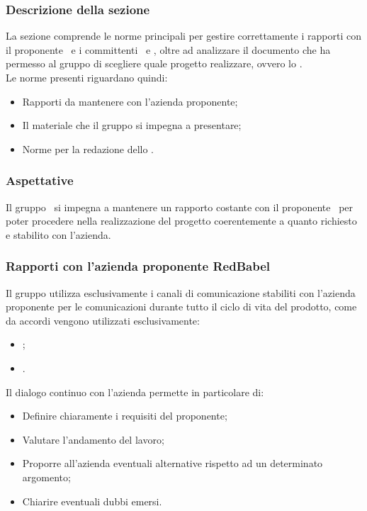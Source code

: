 \subsubsection{Descrizione della sezione} 
La sezione comprende le norme principali per gestire correttamente i rapporti con il proponente \Proponente\ e i committenti \VT\ e \CR, oltre ad analizzare il documento che ha permesso al gruppo di scegliere quale progetto realizzare, ovvero lo .\\
Le norme presenti riguardano quindi:
\begin{itemize}
	\item Rapporti da mantenere con l'azienda proponente;
	\item Il materiale che il gruppo si impegna a presentare;
	\item Norme per la redazione  dello .
\end{itemize}

\subsubsection{Aspettative}
Il gruppo \Gruppo\ si impegna a mantenere un rapporto costante con il proponente \Proponente\ per poter procedere nella realizzazione del progetto coerentemente a quanto richiesto e stabilito con l'azienda.

\subsubsection{Rapporti con l'azienda proponente RedBabel}\label{Rapporti RedBabel}
Il gruppo utilizza esclusivamente i canali di comunicazione stabiliti con l'azienda proponente per le comunicazioni durante tutto il ciclo di vita del prodotto, come da accordi vengono utilizzati esclusivamente:
\begin{itemize}
	\item {};
	\item {}.
\end{itemize}
Il dialogo continuo con l'azienda permette in particolare di:
\begin{itemize}
	\item Definire chiaramente i requisiti del proponente;
	\item Valutare l'andamento del lavoro;
	\item Proporre all'azienda eventuali alternative rispetto ad un determinato argomento;
	\item Chiarire eventuali dubbi emersi.
\end{itemize}

